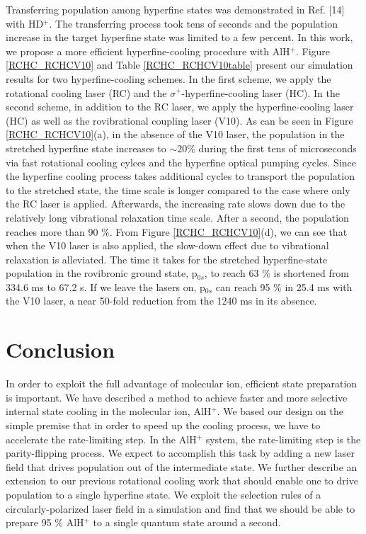 \documentclass[nofootinbib,aip,jcp,reprint]{revtex4-1}
\begin{document}
Transferring population among hyperfine states was demonstrated in Ref. [14] with HD$^{+}$. The transferring process took tens of seconds and the population increase in the target hyperfine state was limited to a few percent. In this work, we propose a more efficient hyperfine-cooling procedure with AlH$^{+}$. Figure \ref{RCHC_RCHCV10} and Table \ref{RCHC_RCHCV10table} present our simulation results for two hyperfine-cooling schemes. In the first scheme, we apply the rotational cooling laser (RC) and the $\sigma^+$-hyperfine-cooling laser (HC). In the second scheme, in addition to the RC laser, we apply the hyperfine-cooling laser (HC) as well as the rovibrational coupling laser (V10). As can be seen in Figure \ref{RCHC_RCHCV10}(a), in the absence of the V10 laser, the population in the stretched hyperfine state increases to $\sim 20 \%$ during the first tens of microseconds via fast rotational cooling cylces and the hyperfine optical pumping cycles. Since the hyperfine cooling process takes additional cycles to transport the population to the stretched state, the time scale is longer compared to the case where only the RC laser is applied. Afterwards, the increasing rate slows down due to the relatively long vibrational relaxation time scale. After a second, the population reaches more than 90 $\%$. From Figure \ref{RCHC_RCHCV10}(d), we can see that when the V10 laser is also applied, the slow-down effect due to vibrational relaxation is alleviated. The time it takes for the stretched hyperfine-state population in the rovibronic ground state, p$_{0s}$, to reach 63 $\%$ is shortened from 334.6 ms to 67.2 {\micro}s. If we leave the lasers on, p$_{0s}$ can reach 95 $\%$ in 25.4 ms with the V10 laser, a near 50-fold reduction from the 1240 ms in its absence. 

\section{Conclusion}
In order to exploit the full advantage of molecular ion, efficient state preparation is important. We have described a method to achieve faster and more selective internal state cooling in the molecular ion, AlH$^+$. We based our design on the simple premise that in order to speed up the cooling process, we have to accelerate the rate-limiting step. In the AlH$^+$ system, the rate-limiting step is the parity-flipping process. We expect to accomplish this task by adding a new laser field that drives population out of the intermediate state. We further describe an extension to our previous rotational cooling work that should enable one to drive population to a single hyperfine state. We exploit the selection rules of a circularly-polarized laser field in a simulation and find that we should be able to prepare 95 $\%$ AlH$^+$ to a single quantum state around a second. 



\end{document}
